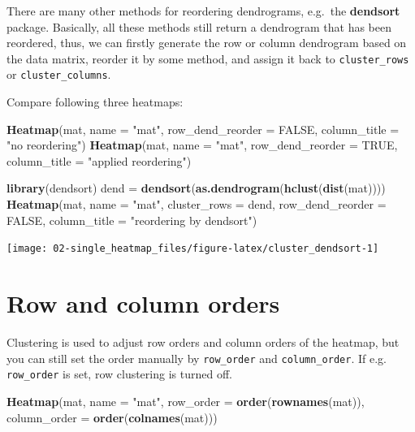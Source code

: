 \documentclass[]{book}
\newenvironment{Shaded}{\begin{snugshade}}{\end{snugshade}}
\newcommand{\KeywordTok}[1]{\textcolor[rgb]{0.13,0.29,0.53}{\textbf{#1}}}
\newcommand{\DataTypeTok}[1]{\textcolor[rgb]{0.13,0.29,0.53}{#1}}
\newcommand{\StringTok}[1]{\textcolor[rgb]{0.31,0.60,0.02}{#1}}
\newcommand{\OtherTok}[1]{\textcolor[rgb]{0.56,0.35,0.01}{#1}}
\newcommand{\NormalTok}[1]{#1}
\theoremstyle{definition}
\theoremstyle{definition}
\theoremstyle{definition}
\theoremstyle{remark}
\begin{document}
There are many other methods for reordering dendrograms, e.g.~the
\textbf{dendsort} package. Basically, all these methods still return a
dendrogram that has been reordered, thus, we can firstly generate the
row or column dendrogram based on the data matrix, reorder it by some
method, and assign it back to \texttt{cluster\_rows} or
\texttt{cluster\_columns}.

Compare following three heatmaps:

\begin{Shaded}
\begin{Highlighting}[]
\KeywordTok{Heatmap}\NormalTok{(mat, }\DataTypeTok{name =} \StringTok{"mat"}\NormalTok{, }\DataTypeTok{row_dend_reorder =} \OtherTok{FALSE}\NormalTok{, }\DataTypeTok{column_title =} \StringTok{"no reordering"}\NormalTok{)}
\KeywordTok{Heatmap}\NormalTok{(mat, }\DataTypeTok{name =} \StringTok{"mat"}\NormalTok{, }\DataTypeTok{row_dend_reorder =} \OtherTok{TRUE}\NormalTok{, }\DataTypeTok{column_title =} \StringTok{"applied reordering"}\NormalTok{)}

\KeywordTok{library}\NormalTok{(dendsort)}
\NormalTok{dend =}\StringTok{ }\KeywordTok{dendsort}\NormalTok{(}\KeywordTok{as.dendrogram}\NormalTok{(}\KeywordTok{hclust}\NormalTok{(}\KeywordTok{dist}\NormalTok{(mat))))}
\KeywordTok{Heatmap}\NormalTok{(mat, }\DataTypeTok{name =} \StringTok{"mat"}\NormalTok{, }\DataTypeTok{cluster_rows =}\NormalTok{ dend, }\DataTypeTok{row_dend_reorder =} \OtherTok{FALSE}\NormalTok{, }
    \DataTypeTok{column_title =} \StringTok{"reordering by dendsort"}\NormalTok{)}
\end{Highlighting}
\end{Shaded}

\begin{center}\texttt{[image: 02-single\_heatmap\_files/figure-latex/cluster\_dendsort-1]} \end{center}

\section{Row and column orders}\label{row-and_column_orders}

Clustering is used to adjust row orders and column orders of the
heatmap, but you can still set the order manually by \texttt{row\_order}
and \texttt{column\_order}. If e.g. \texttt{row\_order} is set, row
clustering is turned off.

\begin{Shaded}
\begin{Highlighting}[]
\KeywordTok{Heatmap}\NormalTok{(mat, }\DataTypeTok{name =} \StringTok{"mat"}\NormalTok{, }\DataTypeTok{row_order =} \KeywordTok{order}\NormalTok{(}\KeywordTok{rownames}\NormalTok{(mat)), }
    \DataTypeTok{column_order =} \KeywordTok{order}\NormalTok{(}\KeywordTok{colnames}\NormalTok{(mat)))}
\end{Highlighting}
\end{Shaded}
\end{document}

